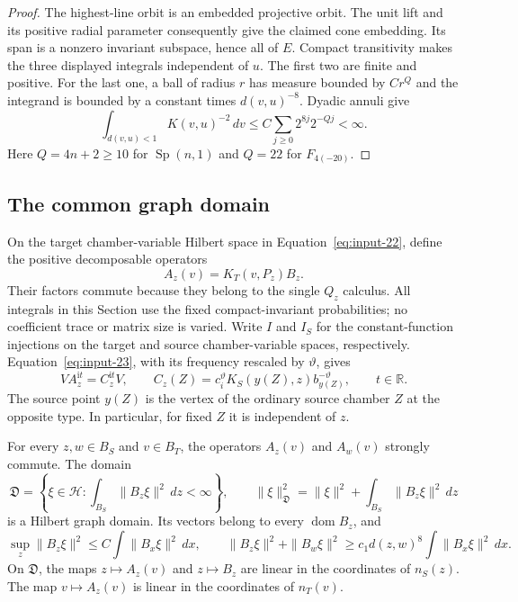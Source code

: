 \begin{proof}
The highest-line orbit is an embedded projective orbit.  The unit
lift and its positive radial parameter consequently give the claimed
cone embedding.  Its span is a nonzero invariant subspace, hence all
of $E$.  Compact transitivity makes the three displayed integrals
independent of $u$.  The first two are finite and positive.  For the
last one, a ball of radius $r$ has measure bounded by $Cr^Q$ and the
integrand is bounded by a constant times $d(v,u)^{-8}$.  Dyadic
annuli give
\[
 \int_{d(v,u)<1}K(v,u)^{-2}\,dv
 \le C\sum_{j\ge0}2^{8j}2^{-Qj}<\infty.
\]
Here $Q=4n+2\ge10$ for $\operatorname{Sp}(n,1)$ and $Q=22$ for $F_{4(-20)}$.
\end{proof}

\subsection{The common graph domain}

On the target chamber-variable Hilbert space in
Equation~\eqref{eq:input-22}, define the positive decomposable
operators
\[
 A_z(v)=K_T(v,P_z)B_z.
\]
Their factors commute because they belong to the single $Q_z$
calculus. All integrals in this Section use the fixed compact-invariant
probabilities; no coefficient trace or matrix size is varied.  Write $I$ and $I_S$ for the constant-function injections on
the target and source chamber-variable spaces, respectively.
Equation~\eqref{eq:input-23}, with its frequency rescaled
by $\vartheta$, gives
\begin{equation}
 V A_z^{\mathrm i t}=C_z^{\mathrm i t}V,
 \qquad
 C_z(Z)=c_i^\vartheta K_S(y(Z),z)b_{y(Z)}^{-\vartheta},
 \qquad t\in\mathbb R.
 \label{eq:locality-positive-exchange}
\end{equation}
The source point $y(Z)$ is the vertex of the ordinary source chamber
$Z$ at the opposite type.  In particular, for fixed $Z$ it is
independent of $z$.

\begin{lemma}
\label{lem:locality-graph-identities}
For every $z,w\in B_S$ and $v\in B_T$, the operators $A_z(v)$ and
$A_w(v)$ strongly commute.  The domain
\[
 \mathfrak D
 =\left\{\xi\in\mathcal H:
          \int_{B_S}\|B_z\xi\|^2\,dz<\infty\right\},
 \qquad
 \|\xi\|_{\mathfrak D}^2
 =\|\xi\|^2+\int_{B_S}\|B_z\xi\|^2\,dz
\]
is a Hilbert graph domain.  Its vectors belong to every $\operatorname{dom} B_z$,
and
\begin{equation}
 \sup_z\|B_z\xi\|^2
 \le C\int\|B_x\xi\|^2\,dx,
 \qquad
 \|B_z\xi\|^2+\|B_w\xi\|^2
 \ge c_1 d(z,w)^8\int\|B_x\xi\|^2\,dx.
 \label{eq:input-24}
\end{equation}
On $\mathfrak D$, the maps $z\mapsto A_z(v)$ and $z\mapsto B_z$
are linear in the coordinates of $n_S(z)$.  The map $v\mapsto A_z(v)$
is linear in the coordinates of $n_T(v)$.
\end{lemma}

